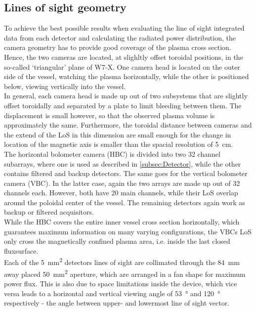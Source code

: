 \documentclass[
    aps,%
    twocolumn,%
    secnumarabic,%
    amssymb,%
    prd,%
    10pt%
    ]{revtex4-1}
\begin{document}
    \subsection{Lines of sight geometry}\label{subsec:Losg}
        To achieve the best possible results when evaluating the line of sight integrated data from each detector and calculating the radiated power distribution, the camera geometry has to provide good coverage of the plasma cross section. Hence, the two cameras are located, at slighltly offset toroidal positions, in the so-called `triangular' plane of W7-X. One camera head is located on the outer side of the vessel, watching the plasma horizontally, while the other is positioned below, viewing vertically into the vessel.\\%
        In general, each camera head is made up out of two subsystems that are slightly offset toroidally and separated by a plate to limit bleeding between them. The displacement is small however, so that the observed plasma volume is approximately the same. Furthermore, the toroidal distance between cameras and the extend of the LoS in this dimension are small enough for the change in location of the magnetic axis is smaller than the spacial resolution of \SI{5}{\centi\meter}.\\%
        The horizontal bolometer camera (HBC) is divided into two 32 channel subarrays, where one is used as described in \cref{subsec:Detector}, while the other contains filtered and backup detectors. The same goes for the vertical bolometer camera (VBC). In the latter case, again the two arrays are made up out of 32 channels each. However, both have 20 main channels, while their LoS overlap around the poloidal center of the vessel. The remaining detectors again work as backup or filtered acquisitors. \\%
        While the HBC covers the entire inner vessel cross section horizontally, which guarantees maximum information on many varying configurations, the VBCs LoS only cross the magnetically confined plasma area, i.e. inside the last closed fluxsurface.\\%
        Each of the \mbox{\SI{5}{\milli\meter\squared}} detectors lines of sight are collimated through the \mbox{\SI{84}{\milli\meter}} away placed \mbox{\SI{50}{\milli\meter\squared}} aperture, which are arranged in a fan shape for maximum power flux. This is also due to space limitations inside the device, which vice versa leads to a horizontal and vertical viewing angle of \mbox{\SI{53}{\degree}} and \mbox{\SI{120}{\degree}} respectively - the angle between upper- and lowermost line of sight vector.%
\end{document}
